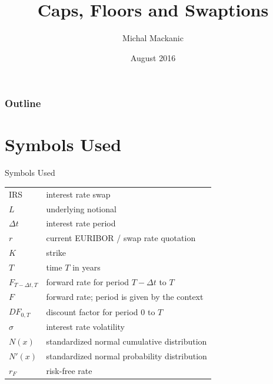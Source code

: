 \documentclass{beamer}
\title[Interest Rate Options]{Caps, Floors and Swaptions}
\author{Michal Mackanic}
\institute{RMO/CZ}
\date{August 2016}
\newcommand\applyFontB{\fontsize{8}{8}\selectfont}
\begin{document}
\begin{frame}
	\titlepage
\end{frame}

\begin{frame}
	\frametitle{Outline}
	\tableofcontents[hideallsubsections]
\end{frame}




\applyFontB

\section{Symbols Used}

\begin{frame}{Symbols Used}
\begin{tabular}{l l}
IRS & interest rate swap\\
$L$ & underlying notional\\
$\Delta t$ & interest rate period\\
$r$ & current EURIBOR / swap rate quotation\\
$K$ & strike\\
$T$ & time $T$ in years\\
$F_{T - \Delta t, T}$ & forward rate for period $T - \Delta t$ to $T$\\
$F$ & forward rate; period is given by the context\\
$DF_{0,T}$ & discount factor for period $0$ to $T$\\
$\sigma$ & interest rate volatility\\
$N(x)$ & standardized normal cumulative distribution\\
$N'(x)$ & standardized normal probability distribution\\
$r_F$ & risk-free rate\\

\end{tabular}
\end{frame}
\end{document}
